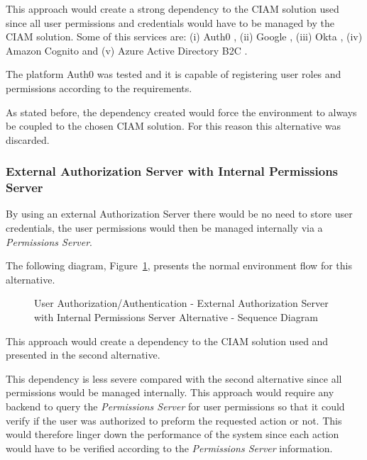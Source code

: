 This approach would create a strong dependency to the \gls{CIAM} solution used since all user permissions and credentials would have to be managed by the \gls{CIAM} solution.
Some of this services are: (i) Auth0 \cite{auth0id}, (ii) Google \cite{googleid}, (iii) Okta \cite{oktaid}, (iv) Amazon Cognito \cite{amazonid} and (v) Azure Active Directory B2C \cite{azureid}.

The platform Auth0 was tested and it is capable of registering user roles and permissions according to the requirements.

As stated before, the dependency created would force the environment to always be coupled to the chosen \gls{CIAM} solution. For this reason this alternative was discarded.

\subsubsection*{External Authorization Server with Internal Permissions Server}
\label{subsubsec:design:alternatives:auth:externalauthinternalpermission}

By using an external Authorization Server there would be no need to store user credentials, the user permissions would then be managed internally via a \textit{Permissions Server}.

The following diagram, Figure~\ref{fig:design:alternatives:auth:externalauthinternalpermission:diagram}, presents the normal environment flow for this alternative.

\begin{figure}[H]
   \centering
   \resizebox{\columnwidth}{!}
   {
      
   }
   \caption[User Authorization/Authentication - External Authorization Server with Internal Permissions Server Alternative - Sequence Diagram]{User Authorization/Authentication - External Authorization Server with Internal Permissions Server Alternative - Sequence Diagram}
   \label{fig:design:alternatives:auth:externalauthinternalpermission:diagram}
\end{figure}

This approach would create a dependency to the \gls{CIAM} solution used and presented in the second alternative.

This dependency is less severe compared with the second alternative since all permissions would be managed internally.
This approach would require any backend to query the \textit{Permissions Server} for user permissions so that it could verify if the user was authorized to preform the requested action or not. This would therefore linger down the performance of the system since each action would have to be verified according to the \textit{Permissions Server} information.

